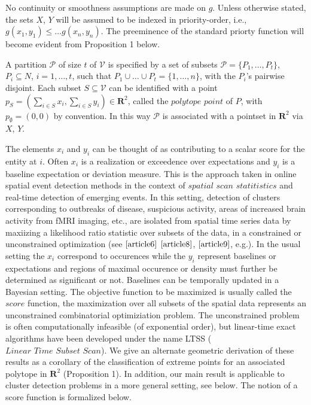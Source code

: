 \documentclass{article}
\theoremstyle{case}
\begin{document}
No continuity or smoothness assumptions are made on $g$. Unless otherwise stated, the sets $X$, $Y$ will be assumed to be indexed in priority-order, i.e., $g(x_1,y_1) \leq \dots g(x_n,y_n)$. The preeminence of the standard priorty function will become evident from Proposition 1 below.

A partition $\mathcal{P}$ of size $t$ of $\mathcal{V}$ is specified by a set of subsets $\mathcal{P} = \{ P_1, \dots, P_t \}$, $P_i \subseteq N$, $i = 1, \dots, t$, such that $P_1 \cup \dots \cup P_t = \{1, \dots, n\}$, with the $P_i$'s pairwise disjoint. Each subset $S \subseteq \mathcal{V}$ can be identified with a point $p_S = (\sum_{i \in S} x_i, \sum_{i \in S}y_i) \in \mathbf{R}^2$, called the $\textit{polytope point}$ of $P$, with $p_{\emptyset} = (0,0)$ by convention. In this way $\mathcal{P}$ is associated with a pointset in $\mathbf{R}^2$ via $X$, $Y$.

The elements $x_i$ and $y_i$ can be thought of as contributing to a scalar score for the entity at $i$. Often $x_i$ is a realization or exceedence over expectations and $y_i$ is a baseline expectation or deviation measure. This is the approach taken in online spatial event detection methods in the context of $\textit{spatial scan statitistics}$ and real-time detection of emerging events. In this setting, detection of clusters corresponding to outbreaks of disease, suspicious activity, areas of increased brain activity from fMRI imaging, etc., are isolated from spatial time series data by maxiizing a likelihood ratio statistic over subsets of the data, in a constrained or unconstrained optimization (see $\cite{article6}$ $\cite{article8}$, $\cite{article9}$, e.g.). In the usual setting the $x_i$ correspond to occurences while the $y_i$ represent baselines or expectations and regions of maximal occurence or density must further be determined as significant or not. Baselines can be temporally updated in a Bayesian setting. The objective function to be maximized is usually called the $\textit{score}$ function, the maximization over all subsets of the spatial data represents an unconstrained combinatorial optimiziation problem. The unconstrained problem is often computationally infeasible (of exponential order), but linear-time exact algorithms have been developed under the name LTSS ($\textit{Linear Time Subset Scan}$). We give an alternate geometric derivation of these results as a corollary of the classification of extreme points for an associated polytope in $\mathbf{R}^2$ (Proposition 1). In addition, our main result is applicable to cluster detection problems in a more general setting, see below. The notion of a score function is formalized below.
\end{document}
